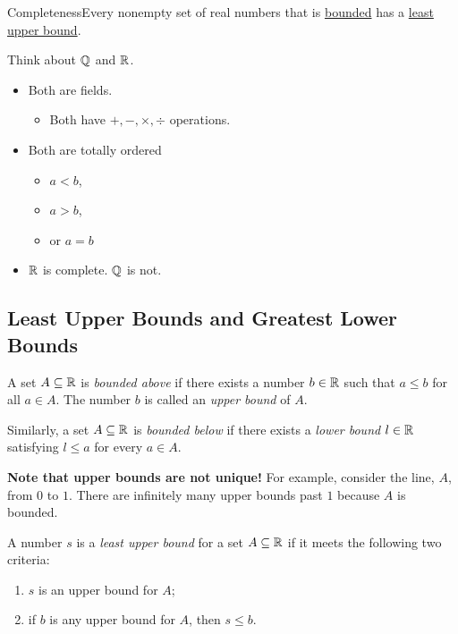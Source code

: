 \begin{axiom}
    {Completeness}Every nonempty set of real numbers that is \hyperref[def:1.3.1]{bounded} has a \hyperref[def:1.3.2]{least upper bound}.
\end{axiom}

Think about \(\mathbb{Q}\) and \(\mathbb{R}\).
\begin{itemize}
    \item Both are fields.
          \begin{itemize}
              \item Both have \(+,-,\times,\div\) operations.
          \end{itemize}
    \item Both are totally ordered
          \begin{itemize}
              \item \(a < b\),
              \item \(a > b\),
              \item or \(a = b\)
          \end{itemize}
    \item \(\mathbb{R}\) is complete. \(\mathbb{Q}\) is not.
\end{itemize}

\subsection{Least Upper Bounds and Greatest Lower Bounds}

\begin{definition}
    A set \(A \subseteq \mathbb{R}\) is \textit{bounded above} if there exists a number \(b \in \mathbb{R}\) such that \(a \leq b\) for all \(a \in A\). The number \(b\) is called an \textit{upper bound} of \(A\).

    Similarly, a set \(A \subseteq \mathbb{R}\) is \textit{bounded below} if there exists a \textit{lower bound} \(l \in \mathbb{R}\) satisfying \(l \leq a\) for every \(a \in A\).
\end{definition}

\textbf{Note that upper bounds are not unique!} For example, consider the line, \(A\), from \(0\) to \(1\). There are infinitely many upper bounds past \(1\) because \(A\) is bounded.

\begin{definition}
    A number \(s\) is a \textit{least upper bound} for a set \(A \subseteq \mathbb{R}\) if it meets the following two criteria:
    \begin{enumerate}[label=(\roman*)]
        \item \(s\) is an upper bound for \(A\);
        \item if \(b\) is any upper bound for \(A\), then \(s \leq b\).
    \end{enumerate}
\end{definition}

